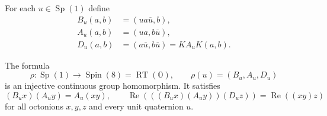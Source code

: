 For each $u\in\operatorname{Sp}(1)$ define
\begin{equation}
 \begin{aligned}
 B_u(a,b)&=(u a\overline u,b),\\
 A_u(a,b)&=(u a,b\overline u),\\
 D_u(a,b)&=(a\overline u,b\overline u)=K A_u K(a,b).
 \end{aligned}
 \label{h24:rettri:threeactions}
\end{equation}

\begin{theorem}
\label{h24:rettri:subgroup}
The formula
\begin{equation}
 \rho:\operatorname{Sp}(1)\longrightarrow\operatorname{Spin}(8)
      =\operatorname{RT}(\mathbb O),\qquad
 \rho(u)=(B_u,A_u,D_u)
 \label{h24:rettri:rho}
\end{equation}
is an injective continuous group homomorphism. It satisfies
\begin{equation}
 (B_u x)(A_u y)=A_u(xy),\qquad
 \operatorname{Re}(((B_u x)(A_u y))(D_u z))
           =\operatorname{Re}((xy)z)
 \label{h24:rettri:product}
\end{equation}
for all octonions $x,y,z$ and every unit quaternion $u$.
\end{theorem}

